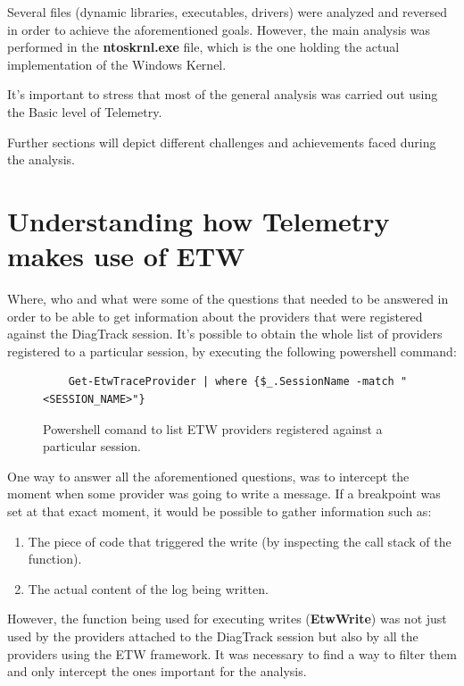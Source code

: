 Several files (dynamic libraries, executables, drivers) were analyzed and reversed in order to achieve the aforementioned goals. However, the main analysis was performed in the {\bfseries ntoskrnl.exe} file, which is the one holding the actual implementation of the Windows Kernel.

It's important to stress that most of the general analysis was carried out using the Basic level of Telemetry. 

Further sections will depict different challenges and achievements faced during the analysis.




\section{Understanding how Telemetry makes use of ETW}
Where, who and what were some of the questions that needed to be answered in order to be able to get information about the providers that were registered against the DiagTrack session. 
It's possible to obtain the whole list of providers registered to a particular session, by executing the following powershell command: 

\begin{figure}[H]
  \begin{lstlisting}
    Get-EtwTraceProvider | where {$_.SessionName -match "<SESSION_NAME>"}
  \end{lstlisting} 
  \caption[]{Powershell comand to list ETW providers registered against a particular session. }
  \label{fig:powershell_cmd}
\end{figure}

One way to answer all the aforementioned questions, was to intercept the moment when some provider was going to write a message. If a breakpoint was set at that exact moment, it would be possible to gather information such as: 
\begin{enumerate}
\item The piece of code that triggered the write (by inspecting the call stack of the function).
\item The actual content of the log being written.
\end{enumerate} 
However, the function being used for executing writes ({\bfseries EtwWrite}) was not just used by the providers attached to the DiagTrack session but also by all the providers using the ETW framework. It was necessary to find a way to filter them and only intercept the ones important for the analysis. 

